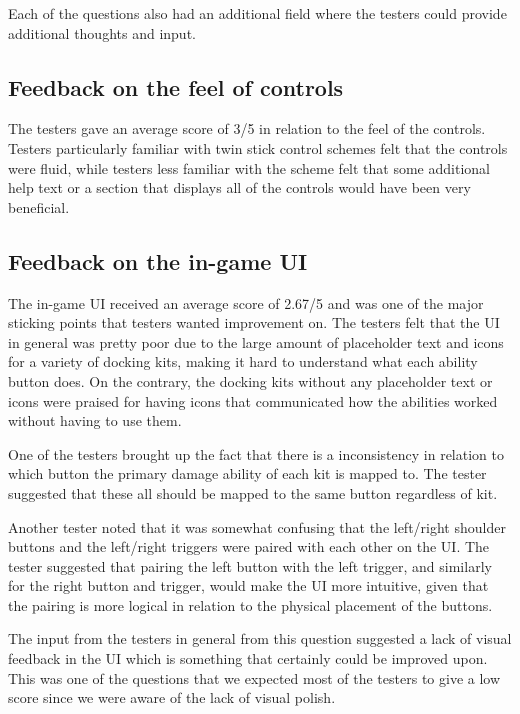 Each of the questions also had an additional field where the testers could provide additional thoughts and input. 

\subsection{Feedback on the feel of controls}
The testers gave an average score of 3/5 in relation to the feel of the controls. Testers particularly familiar with twin stick control schemes felt that the controls were fluid, while testers less familiar with the scheme felt that some additional help text or a section that displays all of the controls would have been very beneficial. 

\subsection{Feedback on the in-game UI}
The in-game UI received an average score of 2.67/5 and was one of the major sticking points that testers wanted improvement on. The testers felt that the UI in general was pretty poor due to the large amount of placeholder text and icons for a variety of docking kits, making it hard to understand what each ability button does. On the contrary, the docking kits without any placeholder text or icons were praised for having icons that communicated how the abilities worked without having to use them. 

One of the testers brought up the fact that there is a inconsistency in relation to which button the primary damage ability of each kit is mapped to. The tester suggested that these all should be mapped to the same button regardless of kit. 

Another tester noted that it was somewhat confusing that the left/right shoulder buttons and the left/right triggers were paired with each other on the UI. The tester suggested that pairing the left button with the left trigger, and similarly for the right button and trigger, would make the UI more intuitive, given that the pairing is more logical in relation to the physical placement of the buttons. 

The input from the testers in general from this question suggested a lack of visual feedback in the UI which is something that certainly could be improved upon. This was one of the questions that we expected most of the testers to give a low score since we were aware of the lack of visual polish. 

